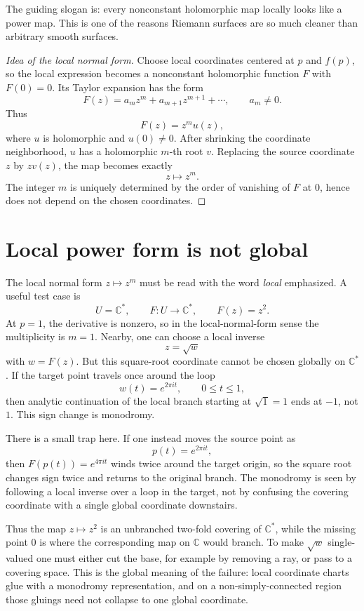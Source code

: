 \begin{remark}
The guiding slogan is: every nonconstant holomorphic map locally looks like a power map.  This is one of the reasons Riemann surfaces are so much cleaner than arbitrary smooth surfaces.
\end{remark}

\begin{proof}[Idea of the local normal form]
Choose local coordinates centered at \(p\) and \(f(p)\), so the local expression becomes a nonconstant holomorphic function \(F\) with \(F(0)=0\).  Its Taylor expansion has the form
\[
  F(z)=a_mz^m+a_{m+1}z^{m+1}+\cdots,
  \qquad a_m\neq0.
\]
Thus
\[
  F(z)=z^m u(z),
\]
where \(u\) is holomorphic and \(u(0)\neq0\).  After shrinking the coordinate neighborhood, \(u\) has a holomorphic \(m\)-th root \(v\).  Replacing the source coordinate \(z\) by \(zv(z)\), the map becomes exactly
\[
  z\mapsto z^m.
\]
The integer \(m\) is uniquely determined by the order of vanishing of \(F\) at \(0\), hence does not depend on the chosen coordinates.
\end{proof}

\section{Local power form is not global}

The local normal form \(z\mapsto z^m\) must be read with the word \emph{local} emphasized.  A useful test case is
\[
  U=\mathbb C^*,
  \qquad
  F:U\to\mathbb C^*,
  \qquad
  F(z)=z^2.
\]
At \(p=1\), the derivative is nonzero, so in the local-normal-form sense the multiplicity is \(m=1\).  Nearby, one can choose a local inverse
\[
  z=\sqrt{w}
\]
with \(w=F(z)\).  But this square-root coordinate cannot be chosen globally on \(\mathbb C^*\).  If the target point travels once around the loop
\[
  w(t)=e^{2\pi it},
  \qquad 0\le t\le1,
\]
then analytic continuation of the local branch starting at \(\sqrt1=1\) ends at \(-1\), not \(1\).  This sign change is monodromy.

There is a small trap here.  If one instead moves the source point as
\[
  p(t)=e^{2\pi it},
\]
then \(F(p(t))=e^{4\pi it}\) winds twice around the target origin, so the square root changes sign twice and returns to the original branch.  The monodromy is seen by following a local inverse over a loop in the target, not by confusing the covering coordinate with a single global coordinate downstairs.

Thus the map \(z\mapsto z^2\) is an unbranched two-fold covering of \(\mathbb C^*\), while the missing point \(0\) is where the corresponding map on \(\mathbb C\) would branch.  To make \(\sqrt w\) single-valued one must either cut the base, for example by removing a ray, or pass to a covering space.  This is the global meaning of the failure: local coordinate charts glue with a monodromy representation, and on a non-simply-connected region those gluings need not collapse to one global coordinate.

